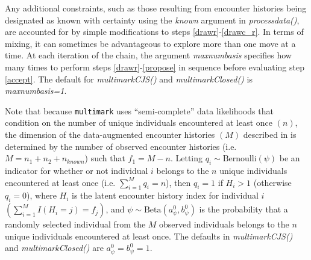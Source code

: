 \documentclass[12pt]{article}
\begin{document}
Any additional constraints, such as those resulting from encounter histories being designated as known with certainty using the \textit{known} argument in \textit{processdata()}, are accounted for by simple modifications to steps \ref{drawr}-\ref{drawc_r}. In terms of mixing, it can sometimes be advantageous to explore more than one move at a time. At each iteration of the chain, the argument \textit{maxnumbasis} specifies how many times to perform steps \ref{drawr}-\ref{propose} in sequence before evaluating step \ref{accept}. The default for \textit{multimarkCJS()} and \textit{multimarkClosed()} is \textit{maxnumbasis=1}.

Note that because \verb|multimark| uses ``semi-complete'' data likelihoods that condition on the number of unique individuals encountered at least once $(n)$, the dimension of the data-augmented encounter histories $(M)$ described in \cite{McClintockEtAl2014} is determined by the number of observed encounter histories (i.e. $M=n_1+n_2+n_{known}$) such that $f_1=M-n$. Letting $q_i \sim \text{Bernoulli} \left(\psi\right)$ be an indicator for whether or not individual $i$ belongs to the $n$ unique individuals encountered at least once (i.e. $\sum_{i=1}^M q_i = n$), then $q_i=1$ if $H_i>1$ (otherwise $q_i=0$), where $H_i$ is the latent encounter history index for individual $i$ $\left(\sum_{i=1}^M I(H_i=j) = f_j\right)$, and $\psi \sim \text{Beta}\left(a^0_\psi,b^0_\psi\right)$ is the probability that a randomly selected individual from the $M$ observed individuals belongs to the $n$ unique individuals encountered at least once. The defaults in \textit{multimarkCJS()} and \textit{multimarkClosed()} are $a^0_\psi=b^0_\psi=1$.



\end{document}
